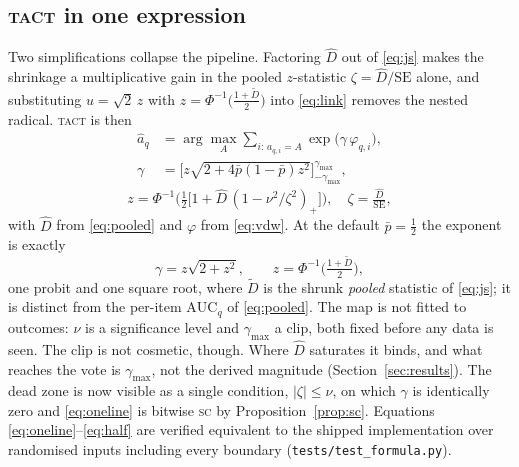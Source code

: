 \documentclass[conference]{IEEEtran}
\newcommand{\Dhat}{\widehat{D}}
\newcommand{\SC}{\textsc{sc}}
\newcommand{\TACT}{\textsc{tact}}
\begin{document}
\subsection{\TACT{} in one expression}\label{sec:oneline}
Two simplifications collapse the pipeline. Factoring $\Dhat$ out of
\eqref{eq:js} makes the shrinkage a multiplicative gain in the pooled
$z$-statistic $\zeta=\Dhat/\mathrm{SE}$ alone, and substituting
$u=\sqrt2\,z$ with $z=\Phi^{-1}\!\big(\tfrac{1+\tilde D}{2}\big)$ into
\eqref{eq:link} removes the nested radical. \TACT{} is then
\begin{equation}\label{eq:oneline}
\boxed{\;
\begin{aligned}
\hat a_q&=\arg\max_A \sum_{i:\,a_{q,i}=A}\exp\big(\gamma\,\varphi_{q,i}\big),\\[2pt]
\gamma&=\Big[z\sqrt{2+4\bar p(1-\bar p)z^{2}}\Big]_{-\gamma_{\max}}^{\gamma_{\max}},
\end{aligned}
\;}
\end{equation}
\begin{equation}\label{eq:oneline2}
z=\Phi^{-1}\!\Big(\tfrac12\big[1+\Dhat\,(1-\nu^{2}/\zeta^{2})_{+}\big]\Big),
\quad \zeta=\tfrac{\Dhat}{\mathrm{SE}},
\end{equation}
with $\Dhat$ from \eqref{eq:pooled} and $\varphi$ from \eqref{eq:vdw}. At the
default $\bar p=\tfrac12$ the exponent is exactly
\begin{equation}\label{eq:half}
\gamma=z\sqrt{2+z^{2}},\qquad z=\Phi^{-1}\!\big(\tfrac{1+\tilde D}{2}\big),
\end{equation}
one probit and one square root, where $\tilde D$ is the shrunk \emph{pooled}
statistic of \eqref{eq:js}; it is distinct from the per-item
$\mathrm{AUC}_q$ of \eqref{eq:pooled}. The map is not fitted to outcomes:
$\nu$ is a
significance level and $\gamma_{\max}$ a clip, both fixed before any data is
seen. The clip is not cosmetic, though. Where $\Dhat$ saturates it binds, and
what reaches the vote is $\gamma_{\max}$, not the derived magnitude
(Section~\ref{sec:results}). The dead zone is now visible as a single condition,
$|\zeta|\le\nu$, on which $\gamma$ is identically zero and \eqref{eq:oneline}
is bitwise \SC{} by Proposition~\ref{prop:sc}. Equations
\eqref{eq:oneline}--\eqref{eq:half} are verified equivalent to the shipped
implementation over randomised inputs including every boundary
(\texttt{tests/test\_formula.py}).
\end{document}
